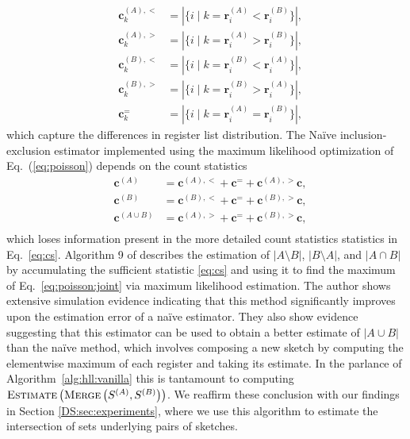 \documentclass{report}
\newcommand{\algoname}[1]{\textnormal{\textsc{#1}}}
\begin{document}
\begin{equation} \label{eq:cs}
	\begin{alignedat}{2}
		&\mathbf{c}^{(A),<}_k &= |\{i \mid k = \mathbf{r}^{(A)}_i < \mathbf{r}^{(B)}_i \}|, \\
		&\mathbf{c}^{(A),>}_k &= |\{i \mid k = \mathbf{r}^{(A)}_i > \mathbf{r}^{(B)}_i \}|, \\
		&\mathbf{c}^{(B),<}_k &= |\{i \mid k = \mathbf{r}^{(B)}_i < \mathbf{r}^{(A)}_i \}|, \\ 
		&\mathbf{c}^{(B),>}_k &= |\{i \mid k = \mathbf{r}^{(B)}_i > \mathbf{r}^{(A)}_i \}|, \\
		&\mathbf{c}^{=}_k &= |\{i \mid k = \mathbf{r}^{(A)}_i = \mathbf{r}^{(B)}_i \}|,
  \end{alignedat}
\end{equation} 
%
which capture the differences in register list distribution.
The Na\"ive inclusion-exclusion estimator implemented using the maximum likelihood optimization of Eq.~(\ref{eq:poisson}) depends on the count statistics %
\begin{equation} \label{eq:naivecs}
	\begin{alignedat}{2}
		&\mathbf{c}^{(A)} &= \mathbf{c}^{(A),<} + \mathbf{c}^= + \mathbf{c}^{(A),>}\mathbf{c}, \\
		&\mathbf{c}^{(B)} &= \mathbf{c}^{(B),<} + \mathbf{c}^= + \mathbf{c}^{(B),>}\mathbf{c}, \\
		&\mathbf{c}^{(A \cup B)} &= \mathbf{c}^{(A),>} + \mathbf{c}^= + \mathbf{c}^{(B),>}\mathbf{c}, \\
  \end{alignedat}
\end{equation} 
%
which loses information present in the more detailed count statistics statistics in Eq.~\eqref{eq:cs}.
Algorithm 9 of \cite{ertl2017new} describes the estimation of $|A \setminus B|$, $|B \setminus A|$, and $|A \cap B|$ by accumulating the sufficient statistic \eqref{eq:cs} and using it to find the maximum of Eq.~\eqref{eq:poisson:joint} via maximum likelihood estimation.
The author shows extensive simulation evidence indicating that this method significantly improves upon the estimation error of a na\"ive estimator.
They also show evidence suggesting that this estimator can be used to obtain a better estimate of $|A \cup B|$ than the na\"ive method, which involves composing a new sketch by computing the elementwise maximum of each register and taking its estimate.
In the parlance of Algorithm~\ref{alg:hll:vanilla} this is tantamount to computing $\algoname{Estimate} \left ( \algoname{Merge} \left ( S^{(A)}, S^{(B)} \right ) \right )$. 
We reaffirm these conclusion with our findings in Section \ref{DS:sec:experiments}, where we use this algorithm to estimate the intersection of sets underlying pairs of sketches.
\end{document}
